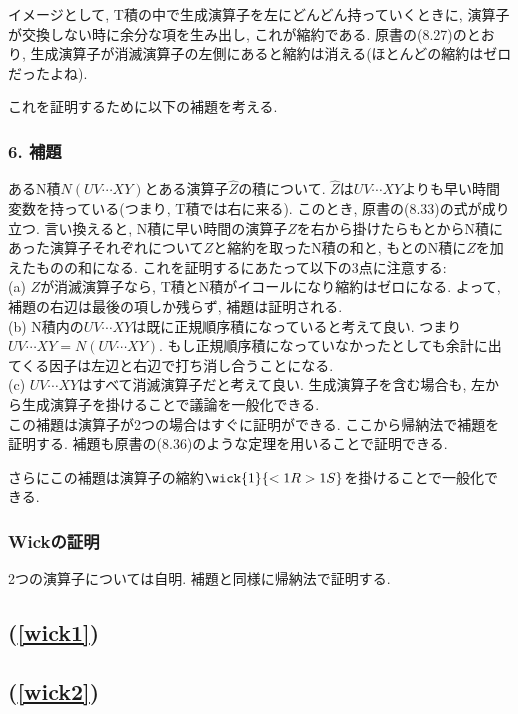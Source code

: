 \documentclass[10.5pt,a4paper]{jreport}
\begin{document}
イメージとして, T積の中で生成演算子を左にどんどん持っていくときに, 演算子が交換しない時に余分な項を生み出し, これが縮約である. 原書の(8.27)のとおり, 生成演算子が消滅演算子の左側にあると縮約は消える(ほとんどの縮約はゼロだったよね).

これを証明するために以下の補題を考える.

\subsubsection{6. 補題}
あるN積$N(UV\cdots XY)$とある演算子$\hat{Z}$の積について. $\hat{Z}$は$UV\cdots XY$よりも早い時間変数を持っている(つまり, T積では右に来る). このとき, 原書の(8.33)の式が成り立つ. 言い換えると, N積に早い時間の演算子$Z$を右から掛けたらもとからN積にあった演算子それぞれについて$Z$と縮約を取ったN積の和と, もとのN積に$Z$を加えたものの和になる. これを証明するにあたって以下の3点に注意する:\\

(a) $Z$が消滅演算子なら, T積とN積がイコールになり縮約はゼロになる. よって, 補題の右辺は最後の項しか残らず, 補題は証明される. \\

(b) N積内の$UV\cdots XY$は既に正規順序積になっていると考えて良い. つまり$UV\cdots XY = N(UV\cdots XY)$. もし正規順序積になっていなかったとしても余計に出てくる因子は左辺と右辺で打ち消し合うことになる. \\

(c) $UV\cdots XY$はすべて消滅演算子だと考えて良い. 生成演算子を含む場合も, 左から生成演算子を掛けることで議論を一般化できる. \\

この補題は演算子が2つの場合はすぐに証明ができる. ここから帰納法で補題を証明する. 補題も原書の(8.36)のような定理を用いることで証明できる.

さらにこの補題は演算子の縮約$\wick{1}{<1R >1S}$を掛けることで一般化できる. 

\subsubsection{Wickの証明}
2つの演算子については自明. 補題と同様に帰納法で証明する. 


\subsection{(\ref{wick1})}
\subsection{(\ref{wick2})}
\end{document}
